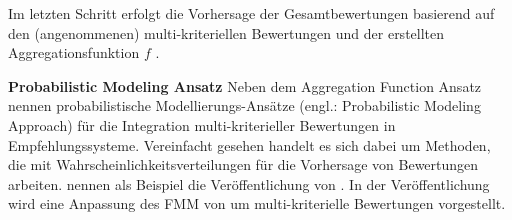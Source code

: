 Im letzten Schritt erfolgt die Vorhersage der Gesamtbewertungen basierend auf den (angenommenen) multi-kriteriellen Bewertungen und der erstellten Aggregationsfunktion $f$ \cite[S. 861]{adomavicius:4:inbook}.

\textbf{Probabilistic Modeling Ansatz}
Neben dem Aggregation Function Ansatz nennen \textcite[S. 861]{adomavicius:4:inbook} probabilistische Modellierungs-Ansätze (engl.: Probabilistic Modeling Approach) für die Integration multi-kriterieller Bewertungen in Empfehlungssysteme.
Vereinfacht gesehen handelt es sich dabei um Methoden, die mit Wahrscheinlichkeitsverteilungen für die Vorhersage von Bewertungen arbeiten.
\textcite[S. 861]{adomavicius:4:inbook} nennen als Beispiel die Veröffentlichung von \textcite[S. 231]{sahoo:article}.
In der Veröffentlichung wird eine Anpassung des \ac{FMM} von \textcite[S. 704ff.]{si:inproceedings} um multi-kriterielle Bewertungen vorgestellt.

